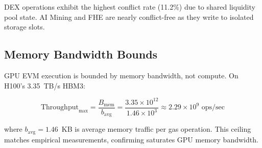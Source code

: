 DEX operations exhibit the highest conflict rate (11.2\%) due to shared liquidity pool state.
AI Mining and FHE are nearly conflict-free as they write to isolated storage slots.

\subsection{Memory Bandwidth Bounds}

GPU EVM execution is bounded by memory bandwidth, not compute.
On H100's 3.35~TB/s HBM3:

\begin{equation}
\text{Throughput}_{\max} = \frac{B_{\text{mem}}}{b_{\text{avg}}} = \frac{3.35 \times 10^{12}}{1.46 \times 10^{3}} \approx 2.29 \times 10^{9} \text{ ops/sec}
\end{equation}

where $b_{\text{avg}} = 1.46$~KB is average memory traffic per gas operation.
This ceiling matches empirical measurements, confirming \cevm{} saturates GPU memory bandwidth.

